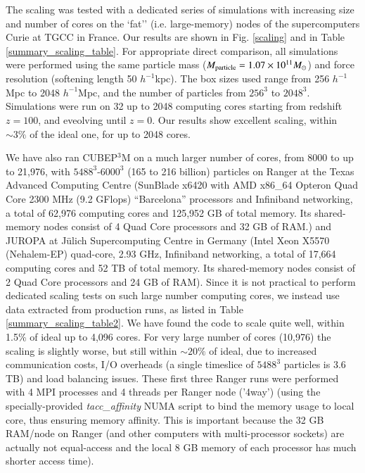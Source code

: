  
The scaling was tested with a dedicated series 
of simulations with increasing size and number of cores on the `fat'' 
(i.e. large-memory) nodes of the supercomputers Curie at TGCC in France. 
Our results are shown in Fig. \ref{scaling} and in 
Table \ref{summary_scaling_table}. For appropriate direct comparison,
all simulations were performed using the same particle mass 
($M_{\rm particle}=1.07\times10^{11}M_\odot$) and force resolution 
(softening length 50 $h^{-1}$kpc). The box sizes used range from 256 $h^{-1}$Mpc
to 2048 $h^{-1}$Mpc, and the number of particles from $256^3$ to $2048^3$.
Simulations were run on 32 up to 2048 computing cores starting from 
redshift $z=100$, and eveolving until $z=0$. Our results show excellent scaling, within 
$\sim3\%$ of the ideal one, for up to 2048 cores. 

We have also ran {\small CUBEP$^3$M} on a much larger number of cores, 
from 8000 to up to 21,976, with $5488^3$-$6000^3$ (165 to 216 billion) 
particles on Ranger at the Texas Advanced Computing Centre (SunBlade 
x6420 with AMD x86\_64 Opteron Quad Core 2300 MHz (9.2 GFlops)
``Barcelona'' processors and Infiniband networking, a total of 62,976 
computing cores and 125,952 GB of total memory. Its shared-memory nodes 
consist of 4 Quad Core processors and 32 GB of RAM.) and JUROPA 
at J\"ulich Supercomputing Centre in Germany (Intel Xeon X5570 
(Nehalem-EP) quad-core, 2.93 GHz, Infiniband networking, a total of 17,664
computing cores and 52 TB of total memory. Its shared-memory nodes 
consist of 2 Quad Core processors and 24 GB of RAM). Since it is not 
practical to perform dedicated scaling tests on such large number 
computing cores, we instead use data extracted from production runs, 
as listed in Table \ref{summary_scaling_table2}. We have found the 
code to scale quite well, within 1.5\% of ideal up to 4,096 cores. 
For very large number of cores (10,976) the scaling is slightly worse,
but still within $\sim20\%$ of ideal, due to increased communication 
costs, I/O overheads (a single timeslice of $5488^3$ particles is 3.6 TB)
and load balancing issues. These first three Ranger runs were performed 
with 4 MPI processes and 4 threads per Ranger node ('4way') (using the 
specially-provided {\it tacc\_affinity} NUMA script to bind the memory 
usage to local core, thus ensuring memory affinity. This is important 
because the 32 GB RAM/node on Ranger (and other computers with 
multi-processor sockets) are actually not equal-access and the local 
8 GB memory of each processor has much shorter access time).

